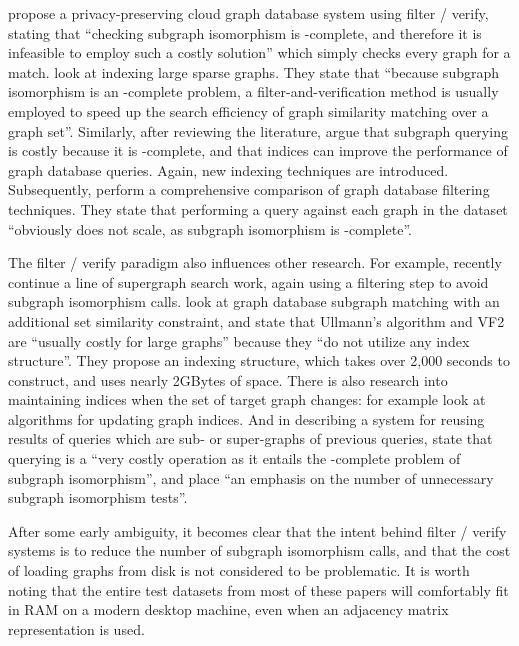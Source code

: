 \documentclass[twoside,11pt]{article}
\newcommand{\citet}[1]{\citeA{#1}}
\begin{document}
\citet{DBLP:conf/icdcs/CaoYWRL11} propose a privacy-preserving cloud graph database system using
filter / verify, stating that ``checking subgraph isomorphism is \NP-complete, and therefore it is
infeasible to employ such a costly solution'' which simply checks every graph for a match.
\citet{DBLP:journals/tkde/WangWYY12} look at indexing large sparse graphs. They state that ``because
subgraph isomorphism is an \NP-complete problem, a filter-and-verification method is usually
employed to speed up the search efficiency of graph similarity matching over a graph set''.
Similarly, after reviewing the literature, \citet{DBLP:journals/vldb/YuanM13} argue that subgraph
querying is costly because it is \NP-complete, and that indices can improve the performance of graph
database queries. Again, new indexing techniques are introduced.  Subsequently,
\citet{DBLP:journals/pvldb/KatsarouNT15} perform a comprehensive comparison of graph database
filtering techniques. They state that performing a query against each graph in the dataset
``obviously does not scale, as subgraph isomorphism is \NP-complete''.

The filter / verify paradigm also influences other research. For example, recently
\citet{DBLP:journals/pvldb/YuanMG13} continue a line of supergraph search work, again using a
filtering step to avoid subgraph isomorphism calls.  \citet{DBLP:journals/tkde/HongZLY15} look at
graph database subgraph matching with an additional set similarity constraint, and state that
Ullmann's algorithm and VF2 are ``usually costly for large graphs'' because they ``do not utilize
any index structure''. They propose an indexing structure, which takes over 2,000 seconds to
construct, and uses nearly 2GBytes of space.  There is also research into maintaining indices when
the set of target graph changes: for example \citet{DBLP:conf/sigmod/YuanMYG15} look at algorithms
for updating graph indices. And in describing a system for reusing results of queries which are sub-
or super-graphs of previous queries, \citet{DBLP:conf/edbt/WangNT16} state that querying is a ``very
costly operation as it entails the \NP-complete problem of subgraph isomorphism'', and place ``an
emphasis on the number of unnecessary subgraph isomorphism tests''.

After some early ambiguity, it becomes clear that the intent behind filter / verify systems is to
reduce the number of subgraph isomorphism calls, and that the cost of loading graphs from disk is
not considered to be problematic. It is worth noting that the entire test datasets from most of
these papers will comfortably fit in RAM on a modern desktop machine, even when an adjacency matrix
representation is used.
\end{document}
